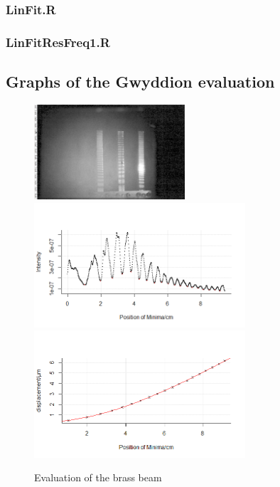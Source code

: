 \subsubsection*{LinFit.R}

\subsubsection*{LinFitResFreq1.R}

\subsection{Graphs of the Gwyddion evaluation}
\label{gwyddion}
\begin{figure}
	\centering
	\includegraphics[width=0.5\textwidth]{../figures/Stab3gwid.png}
	\includegraphics[width=0.7\textwidth]{../figures/Stab3R1.png}
	\includegraphics[width=0.7\textwidth]{../figures/Stab3R2.png}
	\caption{Evaluation of the brass beam}
\end{figure}
